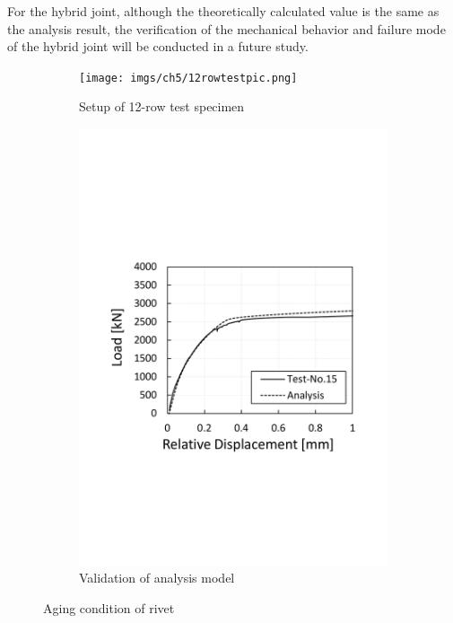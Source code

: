 For the hybrid joint, although the theoretically calculated value is the same as the analysis result, the verification of the mechanical behavior and failure mode of the hybrid joint will be conducted in a future study.

\begin{figure}
    \centering
    \begin{subfigure}[t]{0.4\textwidth}
        \centering
        \texttt{[image: imgs/ch5/12rowtestpic.png]}
        \caption{Setup of 12-row test specimen}
        \label{fig-testset}
    \end{subfigure}
    \hfill
    \begin{subfigure}[t]{0.55\textwidth}
        \centering
        \includegraphics[width=\linewidth]{imgs/ch5/validation.pdf}
        \caption{Validation of analysis model}
        \label{fig-validloadrd}
    \end{subfigure}
    \caption{Aging condition of rivet}
\end{figure}
